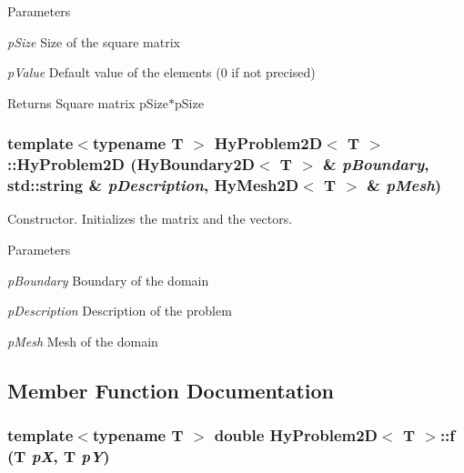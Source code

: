 \begin{DoxyParams}{Parameters}
\item[{\em pSize}]Size of the square matrix \item[{\em pValue}]Default value of the elements (0 if not precised) \end{DoxyParams}
\begin{DoxyReturn}{Returns}
Square matrix pSize$\ast$pSize 
\end{DoxyReturn}
\hypertarget{classHyProblem2D_a8de2354be8948a704b063bddfc530b62}{
\subsubsection[{HyProblem2D}]{\setlength{\rightskip}{0pt plus 5cm}template$<$typename T $>$ {\bf HyProblem2D}$<$ T $>$::{\bf HyProblem2D} ({\bf HyBoundary2D}$<$ T $>$ \& {\em pBoundary}, \/  std::string \& {\em pDescription}, \/  {\bf HyMesh2D}$<$ T $>$ \& {\em pMesh})}}
\label{classHyProblem2D_a8de2354be8948a704b063bddfc530b62}


Constructor. Initializes the matrix and the vectors. 


\begin{DoxyParams}{Parameters}
\item[{\em pBoundary}]Boundary of the domain \item[{\em pDescription}]Description of the problem \item[{\em pMesh}]Mesh of the domain \end{DoxyParams}


\subsection{Member Function Documentation}
\hypertarget{classHyProblem2D_ad12f53b0d42866701690300d520aa8b2}{
\subsubsection[{f}]{\setlength{\rightskip}{0pt plus 5cm}template$<$typename T $>$ double {\bf HyProblem2D}$<$ T $>$::f (T {\em pX}, \/  T {\em pY})}}
\label{classHyProblem2D_ad12f53b0d42866701690300d520aa8b2}


